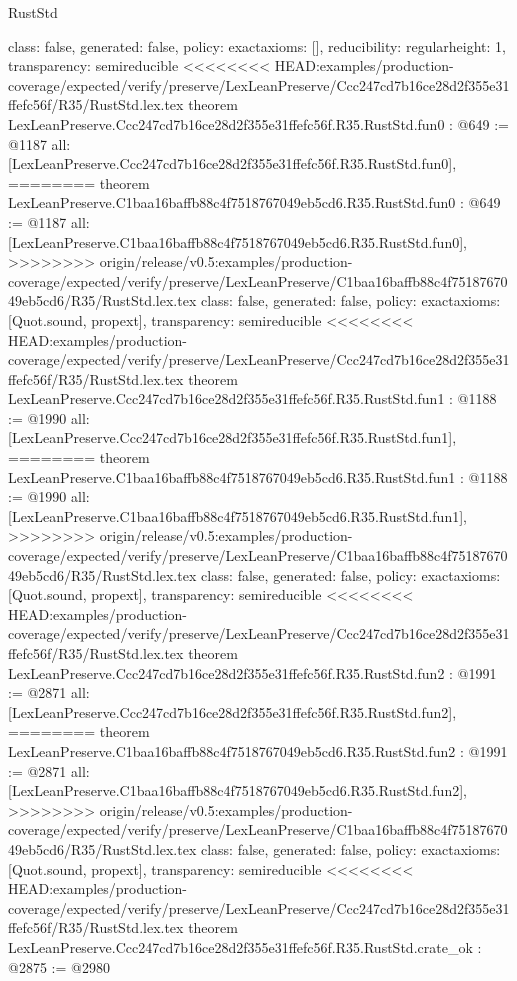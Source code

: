 \begin{lexlean}{RustStd}
\begin{coremodule}
{\begin{coremodule}
{{{  class: false,
  generated: false,
  policy: exact{axioms: []},
  reducibility: regular{height: 1},
  transparency: semireducible
}
<<<<<<<< HEAD:examples/production-coverage/expected/verify/preserve/LexLeanPreserve/Ccc247cd7b16ce28d2f355e31ffefc56f/R35/RustStd.lex.tex
theorem LexLeanPreserve.Ccc247cd7b16ce28d2f355e31ffefc56f.R35.RustStd.fun0 : @649 := @1187 {
  all: [LexLeanPreserve.Ccc247cd7b16ce28d2f355e31ffefc56f.R35.RustStd.fun0],
========
theorem LexLeanPreserve.C1baa16baffb88c4f7518767049eb5cd6.R35.RustStd.fun0 : @649 := @1187 {
  all: [LexLeanPreserve.C1baa16baffb88c4f7518767049eb5cd6.R35.RustStd.fun0],
>>>>>>>> origin/release/v0.5:examples/production-coverage/expected/verify/preserve/LexLeanPreserve/C1baa16baffb88c4f7518767049eb5cd6/R35/RustStd.lex.tex
  class: false,
  generated: false,
  policy: exact{axioms: [Quot.sound, propext]},
  transparency: semireducible
}
<<<<<<<< HEAD:examples/production-coverage/expected/verify/preserve/LexLeanPreserve/Ccc247cd7b16ce28d2f355e31ffefc56f/R35/RustStd.lex.tex
theorem LexLeanPreserve.Ccc247cd7b16ce28d2f355e31ffefc56f.R35.RustStd.fun1 : @1188 := @1990 {
  all: [LexLeanPreserve.Ccc247cd7b16ce28d2f355e31ffefc56f.R35.RustStd.fun1],
========
theorem LexLeanPreserve.C1baa16baffb88c4f7518767049eb5cd6.R35.RustStd.fun1 : @1188 := @1990 {
  all: [LexLeanPreserve.C1baa16baffb88c4f7518767049eb5cd6.R35.RustStd.fun1],
>>>>>>>> origin/release/v0.5:examples/production-coverage/expected/verify/preserve/LexLeanPreserve/C1baa16baffb88c4f7518767049eb5cd6/R35/RustStd.lex.tex
  class: false,
  generated: false,
  policy: exact{axioms: [Quot.sound, propext]},
  transparency: semireducible
}
<<<<<<<< HEAD:examples/production-coverage/expected/verify/preserve/LexLeanPreserve/Ccc247cd7b16ce28d2f355e31ffefc56f/R35/RustStd.lex.tex
theorem LexLeanPreserve.Ccc247cd7b16ce28d2f355e31ffefc56f.R35.RustStd.fun2 : @1991 := @2871 {
  all: [LexLeanPreserve.Ccc247cd7b16ce28d2f355e31ffefc56f.R35.RustStd.fun2],
========
theorem LexLeanPreserve.C1baa16baffb88c4f7518767049eb5cd6.R35.RustStd.fun2 : @1991 := @2871 {
  all: [LexLeanPreserve.C1baa16baffb88c4f7518767049eb5cd6.R35.RustStd.fun2],
>>>>>>>> origin/release/v0.5:examples/production-coverage/expected/verify/preserve/LexLeanPreserve/C1baa16baffb88c4f7518767049eb5cd6/R35/RustStd.lex.tex
  class: false,
  generated: false,
  policy: exact{axioms: [Quot.sound, propext]},
  transparency: semireducible
}
<<<<<<<< HEAD:examples/production-coverage/expected/verify/preserve/LexLeanPreserve/Ccc247cd7b16ce28d2f355e31ffefc56f/R35/RustStd.lex.tex
theorem LexLeanPreserve.Ccc247cd7b16ce28d2f355e31ffefc56f.R35.RustStd.crate_ok : @2875 := @2980 {
}}}}}}
\end{coremodule}}
\end{coremodule}
\end{lexlean}
